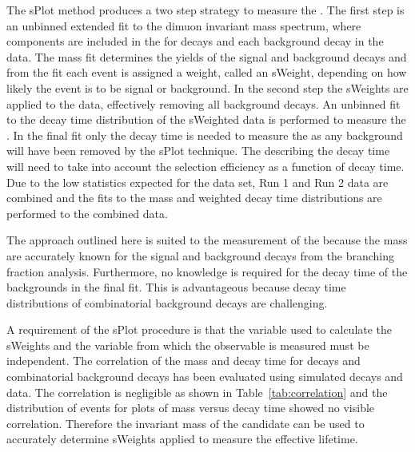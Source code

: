 The sPlot method produces a two step strategy to measure the \el. The first step is an unbinned extended \ml fit to the dimuon invariant mass spectrum, where components are included in the \pdf for \bsmumu decays and each background decay in the data. The mass fit determines the yields of the signal and background decays and from the fit each event is assigned a weight, called an sWeight, depending on how likely the event is to be signal or background. In the second step the sWeights are applied to the data, effectively removing all background decays. An unbinned \ml fit to the decay time distribution of the sWeighted data is performed to measure the \bsmumu \el. In the final fit only the \bsmumu decay time \pdf is needed to measure the \el as any background will have been removed by the sPlot technique. The \pdf describing the decay time will need to take into account the selection efficiency as a function of decay time. Due to the low statistics expected for the data set, Run 1 and Run 2 data are combined and the fits to the mass and weighted decay time distributions are performed to the combined data.


The approach outlined here is suited to the measurement of the \bsmumu \el because the mass \pdfs are accurately known for the signal and background decays from the branching fraction analysis. Furthermore, no knowledge is required for the decay time \pdfs of the backgrounds in the final fit. This is advantageous because decay time distributions of combinatorial background decays are challenging.


A requirement of the sPlot procedure is that the variable used to calculate the sWeights and the variable from which the observable is measured must be independent. The correlation of the mass and decay time for \bsmumu decays and combinatorial background decays has been evaluated using simulated decays and data. The correlation is negligible %
as shown in Table~\ref{tab:correlation} and the distribution of events for plots of mass versus decay time showed no visible correlation. Therefore the invariant mass of the \bsmumu candidate can be used to accurately determine sWeights applied  to measure the \bsmumu effective lifetime.


